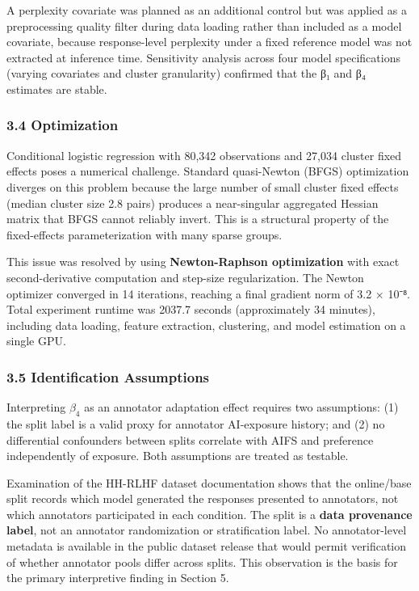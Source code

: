 A perplexity covariate was planned as an additional control but was applied as a preprocessing quality filter during data loading rather than included as a model covariate, because response-level perplexity under a fixed reference model was not extracted at inference time. Sensitivity analysis across four model specifications (varying covariates and cluster granularity) confirmed that the β₁ and β₄ estimates are stable.

\subsubsection{3.4 Optimization}

Conditional logistic regression with 80,342 observations and 27,034 cluster fixed effects poses a numerical challenge. Standard quasi-Newton (BFGS) optimization diverges on this problem because the large number of small cluster fixed effects (median cluster size 2.8 pairs) produces a near-singular aggregated Hessian matrix that BFGS cannot reliably invert. This is a structural property of the fixed-effects parameterization with many sparse groups.

This issue was resolved by using \textbf{Newton-Raphson optimization} with exact second-derivative computation and step-size regularization. The Newton optimizer converged in 14 iterations, reaching a final gradient norm of 3.2 × 10⁻⁸. Total experiment runtime was 2037.7 seconds (approximately 34 minutes), including data loading, feature extraction, clustering, and model estimation on a single GPU.

\subsubsection{3.5 Identification Assumptions}

Interpreting $\beta_4$ as an annotator adaptation effect requires two assumptions: (1) the split label is a valid proxy for annotator AI-exposure history; and (2) no differential confounders between splits correlate with AIFS and preference independently of exposure. Both assumptions are treated as testable.

Examination of the HH-RLHF dataset documentation shows that the online/base split records which model generated the responses presented to annotators, not which annotators participated in each condition. The split is a \textbf{data provenance label}, not an annotator randomization or stratification label. No annotator-level metadata is available in the public dataset release that would permit verification of whether annotator pools differ across splits. This observation is the basis for the primary interpretive finding in Section 5.

